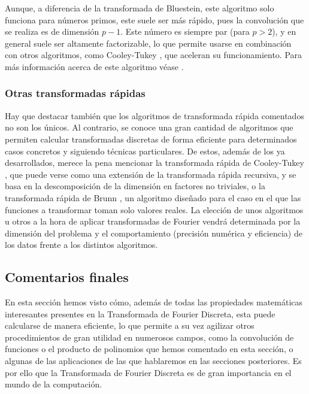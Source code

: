 \documentclass{article}
\begin{document}
Aunque, a diferencia de la transformada de Bluestein, este algoritmo solo funciona para números primos, este suele ser más rápido, pues la convolución que se realiza es de dimensión $p-1$. Este número es siempre par (para $p > 2$), y en general suele ser altamente factorizable, lo que permite usarse en combinación con otros algoritmos, como Cooley-Tukey \cite{cooley}, que aceleran su funcionamiento. Para más información acerca de este algoritmo véase \cite{engelberg2017elementary}.

\subsubsection{Otras transformadas rápidas}

Hay que destacar también que los algoritmos de transformada rápida comentados no son los únicos. Al contrario, se conoce una gran cantidad de algoritmos que permiten calcular transformadas discretas de forma eficiente para determinados casos concretos y siguiendo técnicas particulares. De estos, además de los ya desarrollados, merece la pena mencionar la transformada rápida de Cooley-Tukey \cite{cooley}, que puede verse como una extensión de la transformada rápida recursiva, y se basa en la descomposición de la dimensión en factores no triviales, o la transformada rápida de Brunn \cite{bruun1978z}, un algoritmo diseñado para el caso en el que las funciones a transformar toman solo valores reales. La elección de unos algoritmos u otros a la hora de aplicar transformadas de Fourier vendrá determinada por la dimensión del problema y el comportamiento (precisión numérica y eficiencia) de los datos frente a los distintos algoritmos. 

\subsection{Comentarios finales}

En esta sección hemos visto cómo, además de todas las propiedades matemáticas interesantes presentes en la Transformada de Fourier Discreta, esta puede calcularse de manera eficiente, lo que permite a su vez agilizar otros procedimientos de gran utilidad en numerosos campos, como la convolución de funciones o el producto de polinomios que hemos comentado en esta sección, o algunas de las aplicaciones de las que hablaremos en las secciones posteriores. Es por ello que la Transformada de Fourier Discreta es de gran importancia en el mundo de la computación.

\end{document}
